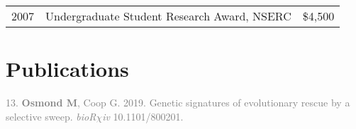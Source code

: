 \documentclass[12pt]{article}
\begin{document}
\begin{tabular}{llr}
  2007 & Undergraduate Student Research Award, NSERC & \$4,500\\
\end{tabular}

\section*{Publications}

%
%

\noindent\hspace{.1cm}\textcolor{gray}{13. \textbf{Osmond M}, Coop G. 2019. Genetic signatures of evolutionary rescue by a selective sweep. \textit{bioR$\chi$iv} 10.1101/800201.}
\end{document}
